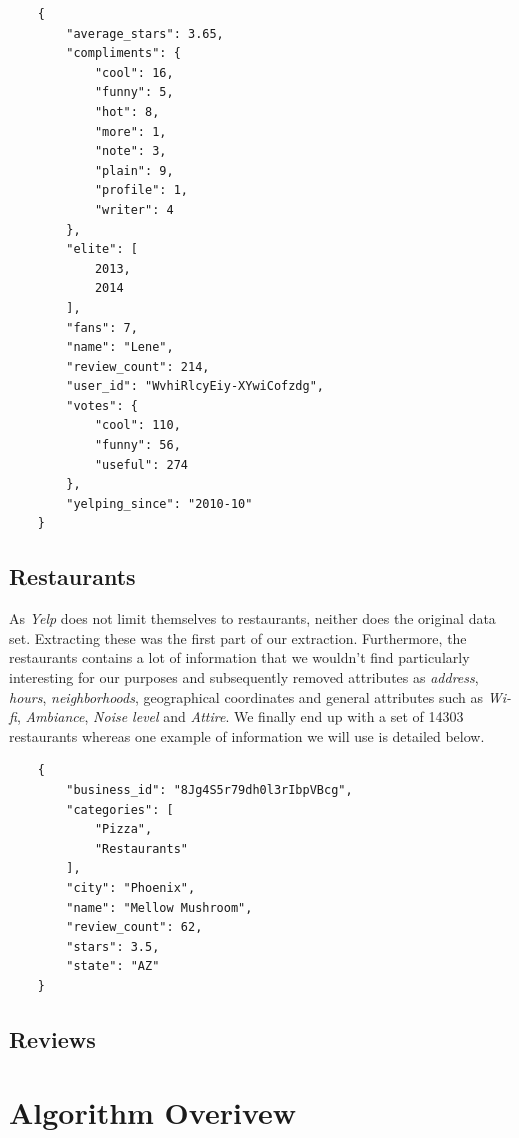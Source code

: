 \documentclass[10pt,twocolumn,letterpaper]{article}
\begin{document}
\begin{verbatim}
	{
        "average_stars": 3.65,
        "compliments": {
            "cool": 16,
            "funny": 5,
            "hot": 8,
            "more": 1,
            "note": 3,
            "plain": 9,
            "profile": 1,
            "writer": 4
        },
        "elite": [
            2013,
            2014
        ],
        "fans": 7,
        "name": "Lene",
        "review_count": 214,
        "user_id": "WvhiRlcyEiy-XYwiCofzdg",
        "votes": {
            "cool": 110,
            "funny": 56,
            "useful": 274
        },
        "yelping_since": "2010-10"
    }
\end{verbatim}

\subsection{Restaurants}
As \textit{Yelp} does not limit themselves to restaurants, neither does the original data set. Extracting these was the first part of our extraction. Furthermore, the restaurants contains a lot of information that we wouldn't find particularly interesting for our purposes and subsequently removed attributes as \textit{address}, \textit{hours}, \textit{neighborhoods}, geographical coordinates and general attributes such as \textit{Wi-fi}, \textit{Ambiance}, \textit{Noise level} and \textit{Attire}. We finally end up with a set of 14303 restaurants whereas one example of information we will use is detailed below.

\begin{verbatim}
	{
	    "business_id": "8Jg4S5r79dh0l3rIbpVBcg",
	    "categories": [
	        "Pizza",
	        "Restaurants"
	    ],
	    "city": "Phoenix",
	    "name": "Mellow Mushroom",
	    "review_count": 62,
	    "stars": 3.5,
	    "state": "AZ"
	}
\end{verbatim}

\subsection{Reviews}


\section{Algorithm Overivew}
\end{document}
